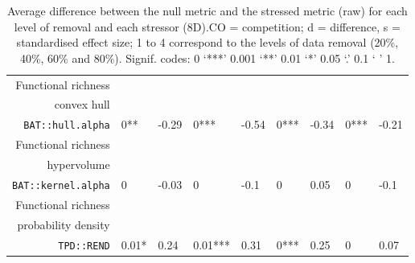 \begin{table}[ht]
\begin{tabular}{rllllllll}
  Functional richness\\convex hull\\\texttt{BAT::hull.alpha} & 0** & -0.29 & 0*** & -0.54 & 0*** & -0.34 & 0*** & -0.21 \\ 
  Functional richness\\hypervolume\\\texttt{BAT::kernel.alpha} & 0 & -0.03 & 0 & -0.1 & 0 & 0.05 & 0 & -0.1 \\ 
  Functional richness\\probability density\\\texttt{TPD::REND} & 0.01* & 0.24 & 0.01*** & 0.31 & 0*** & 0.25 & 0 & 0.07 \\ 
   \hline
\end{tabular}
\caption{Average difference between the null metric and the stressed metric (raw) for each level of removal and each stressor (8D).CO = competition; d = difference, s = standardised effect size; 1 to 4 correspond to the levels of data removal (20\%, 40\%, 60\% and 80\%). Signif. codes:  0 ‘***’ 0.001 ‘**’ 0.01 ‘*’ 0.05 ‘.’ 0.1 ‘ ’ 1.} 
\end{table}
